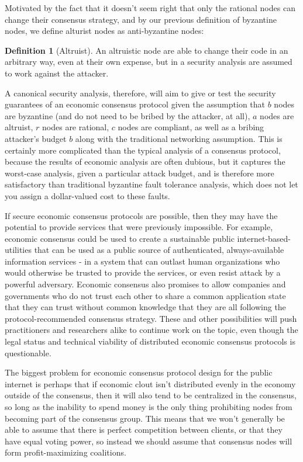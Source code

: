 \documentclass[11pt,a4paper]{article}
\theoremstyle{plain}
\theoremstyle{definition}
\newtheorem{defn}{Definition}
\begin{document}
Motivated by the fact that it doesn't seem right that only the rational nodes can change their consensus strategy, and by our previous definition of byzantine nodes, we define alturist nodes as anti-byzantine nodes:

\begin{defn}[Altruist]
An altruistic node are able to change their code in an arbitrary way, even at their own expense, but in a security analysis are assumed to work against the attacker.
\end{defn}

A canonical security analysis, therefore, will aim to give or test the security guarantees of an economic consensus protocol given the assumption that $b$ nodes are byzantine (and do not need to be bribed by the attacker, at all), $a$ nodes are altruist, $r$ nodes are rational, $c$ nodes are compliant, as well as a bribing attacker's budget $b$ along with the traditional networking assumption. This is certainly more complicated than the typical analysis of a consensus protocol, because the results of economic analysis are often dubious, but it captures the worst-case analysis, given a particular attack budget, and is therefore more satisfactory than traditional byzantine fault tolerance analysis, which does not let you assign a dollar-valued cost to these faults. 

If secure economic consensus protocols are possible, then they may have the potential to provide services that were previously impossible. For example, economic consensus could be used to create a sustainable public internet-based-utilities that can be used as a public source of authenticated, always-available information services - in a system that can outlast human organizations who would otherwise be trusted to provide the services, or even resist attack by a powerful adversary. Economic consensus also promises to allow companies and governments who do not trust each other to share a common application state that they can trust without common knowledge that they are all following the protocol-recommended consensus strategy. These and other possibilities will push practitioners and researchers alike to continue work on the topic, even though the legal status and technical viability of distributed economic consensus protocols is questionable.

The biggest problem for economic consensus protocol design for the public internet is perhaps that if economic clout isn't distributed evenly in the economy outside of the consensus, then it will also tend to be centralized in the consensus, so long as the inability to spend money is the only thing prohibiting nodes from becoming part of the consensus group. This means that we won't generally be able to assume that there is perfect competition between clients, or that they have equal voting power, so instead we should assume that consensus nodes will form profit-maximizing coalitions.
\end{document}
